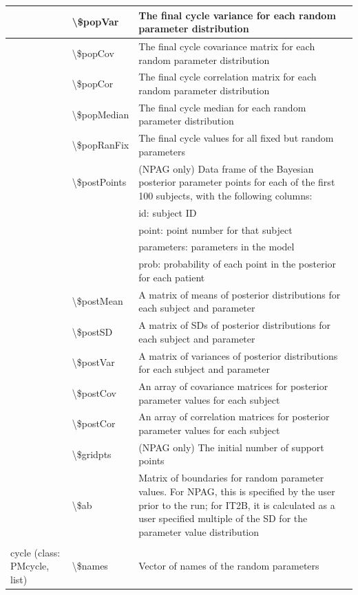 \documentclass[
]{book}
\begin{document}
\begin{tabular}{l|l|l}
\hline
 & \textbackslash{}\$popVar & The final cycle variance for each random parameter distribution\\
\hline
 & \textbackslash{}\$popCov & The final cycle covariance matrix for each random parameter distribution\\
\hline
 & \textbackslash{}\$popCor & The final cycle correlation matrix for each random parameter distribution\\
\hline
 & \textbackslash{}\$popMedian & The final cycle median for each random parameter distribution\\
\hline
 & \textbackslash{}\$popRanFix & The final cycle values for all fixed but random parameters\\
\hline
 & \textbackslash{}\$postPoints & (NPAG only) Data frame of the Bayesian posterior parameter points for each of the first 100 subjects, with the following columns:\\
\hline
 &  & id: subject ID\\
\hline
 &  & point: point number for that subject\\
\hline
 &  & parameters: parameters in the model\\
\hline
 &  & prob: probability of each point in the posterior for each patient\\
\hline
 & \textbackslash{}\$postMean & A matrix of means of posterior distributions for each subject and parameter\\
\hline
 & \textbackslash{}\$postSD & A matrix of SDs of posterior distributions for each subject and parameter\\
\hline
 & \textbackslash{}\$postVar & A matrix of variances of posterior distributions for each subject and parameter\\
\hline
 & \textbackslash{}\$postCov & An array of covariance matrices for posterior parameter values for each subject\\
\hline
 & \textbackslash{}\$postCor & An array of correlation matrices for posterior parameter values for each subject\\
\hline
 & \textbackslash{}\$gridpts & (NPAG only) The initial number of support points\\
\hline
 & \textbackslash{}\$ab & Matrix of boundaries for random parameter values.  For NPAG, this is specified by the user prior to the run; for IT2B, it is calculated as a user specified multiple of the SD for the parameter value distribution\\
\hline
 &  & \\
\hline
cycle (class: PMcycle, list) & \textbackslash{}\$names & Vector of names of the random parameters\\

\end{tabular}
\end{document}

